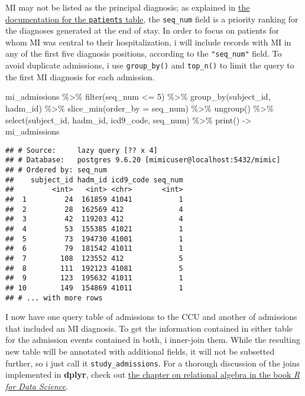 \documentclass[
]{article}
\newenvironment{Shaded}{\begin{snugshade}}{\end{snugshade}}
\newcommand{\AttributeTok}[1]{\textcolor[rgb]{0.77,0.63,0.00}{#1}}
\newcommand{\DecValTok}[1]{\textcolor[rgb]{0.00,0.00,0.81}{#1}}
\newcommand{\FunctionTok}[1]{\textcolor[rgb]{0.00,0.00,0.00}{#1}}
\newcommand{\NormalTok}[1]{#1}
\newcommand{\OtherTok}[1]{\textcolor[rgb]{0.56,0.35,0.01}{#1}}
\newcommand{\SpecialCharTok}[1]{\textcolor[rgb]{0.00,0.00,0.00}{#1}}
\begin{document}
MI may not be listed as the principal diagnosis; as explained in
\href{https://mimic.physionet.org/mimictables/diagnoses_icd/}{the
documentation for the \texttt{patients} table}, the \texttt{seq\_num}
field is a priority ranking for the diagnoses generated at the end of
stay. In order to focus on patients for whom MI was central to their
hospitalization, i will include records with MI in any of the first five
diagnosis positions, according to the \texttt{"seq\_num"} field. To
avoid duplicate admissions, i use \texttt{group\_by()} and
\texttt{top\_n()} to limit the query to the first MI diagnosis for each
admission.

\begin{Shaded}
\begin{Highlighting}[]
\NormalTok{mi\_admissions }\SpecialCharTok{\%\textgreater{}\%}
  \FunctionTok{filter}\NormalTok{(seq\_num }\SpecialCharTok{\textless{}=} \DecValTok{5}\NormalTok{) }\SpecialCharTok{\%\textgreater{}\%}
  \FunctionTok{group\_by}\NormalTok{(subject\_id, hadm\_id) }\SpecialCharTok{\%\textgreater{}\%}
  \FunctionTok{slice\_min}\NormalTok{(}\AttributeTok{order\_by =}\NormalTok{ seq\_num) }\SpecialCharTok{\%\textgreater{}\%}
  \FunctionTok{ungroup}\NormalTok{() }\SpecialCharTok{\%\textgreater{}\%}
  \FunctionTok{select}\NormalTok{(subject\_id, hadm\_id, icd9\_code, seq\_num) }\SpecialCharTok{\%\textgreater{}\%}
  \FunctionTok{print}\NormalTok{() }\OtherTok{{-}\textgreater{}}\NormalTok{ mi\_admissions}
\end{Highlighting}
\end{Shaded}

\begin{verbatim}
## # Source:     lazy query [?? x 4]
## # Database:   postgres 9.6.20 [mimicuser@localhost:5432/mimic]
## # Ordered by: seq_num
##    subject_id hadm_id icd9_code seq_num
##         <int>   <int> <chr>       <int>
##  1         24  161859 41041           1
##  2         28  162569 412             4
##  3         42  119203 412             4
##  4         53  155385 41021           1
##  5         73  194730 41001           1
##  6         79  181542 41011           1
##  7        108  123552 412             5
##  8        111  192123 41081           5
##  9        123  195632 41011           1
## 10        149  154869 41011           1
## # ... with more rows
\end{verbatim}

I now have one query table of admissions to the CCU and another of
admissions that included an MI diagnosis. To get the information
contained in either table for the admission events contained in both, i
inner-join them. While the resulting new table will be annotated with
additional fields, it will not be subsetted further, so i just call it
\texttt{study\_admissions}. For a thorough discussion of the joins
implemented in \textbf{dplyr}, check out
\href{https://r4ds.had.co.nz/relational-data.html}{the chapter on
relational algebra in the book \emph{R for Data Science}}.
\end{document}
